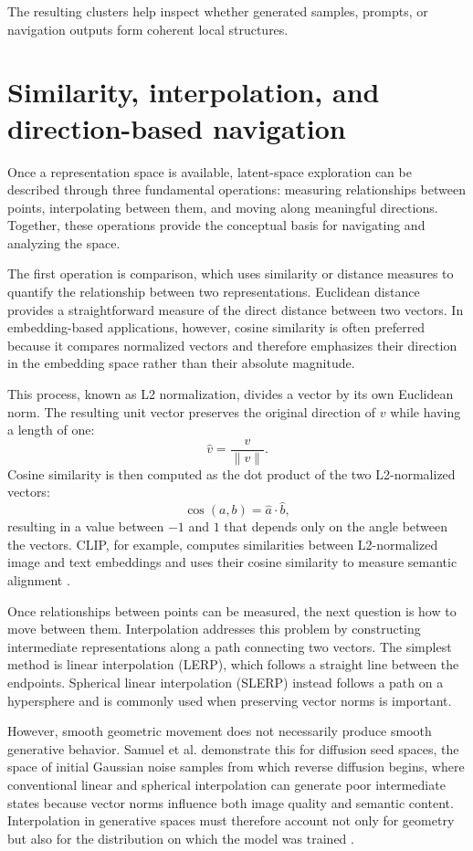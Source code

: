 The resulting clusters help inspect whether generated samples, prompts, or navigation outputs form coherent local structures.

\section{Similarity, interpolation, and direction-based navigation}\label{sec:2.6}

Once a representation space is available, latent-space exploration can be described through three fundamental operations: measuring relationships between points, interpolating between them, and moving along meaningful directions. Together, these operations provide the conceptual basis for navigating and analyzing the space.

The first operation is comparison, which uses similarity or distance measures to quantify the relationship between two representations. Euclidean distance provides a straightforward measure of the direct distance between two vectors. In embedding-based applications, however, cosine similarity is often preferred because it compares normalized vectors and therefore emphasizes their direction in the embedding space rather than their absolute magnitude.

This process, known as L2 normalization, divides a vector by its own Euclidean norm. The resulting unit vector preserves the original direction of $v$ while having a length of one:
\[
\hat{v} = \frac{v}{\lVert v \rVert}.
\]
Cosine similarity is then computed as the dot product of the two L2-normalized vectors:
\[
\cos(a, b) = \hat{a} \cdot \hat{b},
\]
resulting in a value between $-1$ and $1$ that depends only on the angle between the vectors. CLIP, for example, computes similarities between L2-normalized image and text embeddings and uses their cosine similarity to measure semantic alignment \cite{radford2021clip}.

Once relationships between points can be measured, the next question is how to move between them. Interpolation addresses this problem by constructing intermediate representations along a path connecting two vectors. The simplest method is linear interpolation (LERP), which follows a straight line between the endpoints. Spherical linear interpolation (SLERP) instead follows a path on a hypersphere and is commonly used when preserving vector norms is important.

However, smooth geometric movement does not necessarily produce smooth generative behavior. Samuel et al. demonstrate this for diffusion seed spaces, the space of initial Gaussian noise samples from which reverse diffusion begins, where conventional linear and spherical interpolation can generate poor intermediate states because vector norms influence both image quality and semantic content. Interpolation in generative spaces must therefore account not only for geometry but also for the distribution on which the model was trained \cite{samuel2023normguided}.

